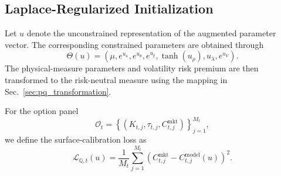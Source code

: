 \documentclass[sigconf,anonymous,review]{acmart}
\begin{document}

\subsection{Laplace-Regularized Initialization}
\label{sec:laplace_initialization}

Let \(u\) denote the unconstrained representation of the augmented parameter vector. The corresponding constrained parameters are obtained through
%
\begin{equation}
\Theta(u)
=
\left(
\mu,
e^{u_{\kappa}},
e^{u_{\theta}},
e^{u_{\xi}},
\tanh(u_{\rho}),
u_{\lambda},
e^{u_V}
\right).
\label{eq:parameter_transform}
\end{equation}
%
The physical-measure parameters and volatility risk premium are then transformed to the risk-neutral measure using the mapping in Sec.~\ref{sec:pq_transformation}.

For the option panel
%
\begin{equation}
\mathcal{O}_t
=
\left\{
\left(
K_{t,j},
\tau_{t,j},
C_{t,j}^{\mathrm{mkt}}
\right)
\right\}_{j=1}^{M_t},
\end{equation}
%
we define the surface-calibration loss as
%
\begin{equation}
\mathcal{L}_{\mathbb{Q},t}(u)
=
\frac{1}{M_t}
\sum_{j=1}^{M_t}
\left(
C_{t,j}^{\mathrm{mkt}}
-
C_{t,j}^{\mathrm{model}}(u)
\right)^2.
\label{eq:q_surface_loss}
\end{equation}
\end{document}
